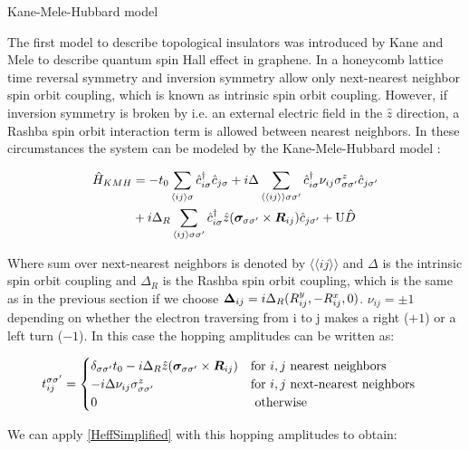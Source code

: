 \begin{section}{Kane-Mele-Hubbard model}

The first model to describe topological insulators was introduced by Kane and Mele \cite{Kane2005} to describe quantum spin Hall effect in graphene. In a honeycomb lattice time reversal symmetry and inversion symmetry allow only next-nearest neighbor spin orbit coupling, which is known as intrinsic spin orbit coupling. However, if inversion symmetry is broken by i.e. an external electric field in the $\hat{z}$ direction, a Rashba spin orbit interaction term is allowed between nearest neighbors. In these circumstances the system can be modeled by the Kane-Mele-Hubbard model \cite{Laubach2014}:

\begin{align}
\hat{H}_{KMH} &= -t_0\sum_{\langle i j \rangle \sigma} \hat{c}^{\dagger}_{i\sigma}\hat{c}_{j\sigma} + i\Delta \sum_{\langle \langle i j \rangle \rangle \sigma \sigma'} \hat{c}^{\dagger}_{i\sigma} \nu_{ij} \sigma^z_{\sigma \sigma'} \hat{c}_{j\sigma'} \nonumber \\
&+ i\Delta_R \sum_{\langle i j \rangle \sigma \sigma'} \hat{c}^{\dagger}_{i\sigma} \hat{z}(\boldsymbol{\sigma}_{\sigma \sigma'} \times \boldsymbol{R}_{ij}) \hat{c}_{j\sigma'} + \text{U}\hat{D}
\end{align}

Where sum over next-nearest neighbors is denoted by $\langle \langle i j \rangle \rangle$ and $\Delta$ is the intrinsic spin orbit coupling and $\Delta_R$ is the Rashba spin orbit coupling, which is the same as in the previous section if we choose $\boldsymbol{\Delta}_{ij} = i\Delta_R (R_{ij}^y, - R_{ij}^x, 0)$. $\nu_{ij}=\pm 1$ depending on whether the electron traversing from i to j makes a right ($+1$) or a left turn ($-1$). In this case the hopping amplitudes can be written as:

\begin{equation}
\label{HoppHubbSOI}
t_{ij}^{\sigma \sigma'} = \begin{cases}
	\delta_{\sigma \sigma'}t_0- i\Delta_R \hat{z}(\boldsymbol{\sigma}_{\sigma \sigma'} \times \boldsymbol{R}_{ij}) & \text{for } i, j \text{ nearest neighbors} \\
	-i\Delta \nu_{ij} \sigma_{\sigma \sigma'}^z & \text{for } i, j \text{ next-nearest neighbors} \\
	0 & \text{ otherwise}
\end{cases} \quad
\end{equation}

We can apply \ref{HeffSimplified} with this hopping amplitudes to obtain:


\end{section}
